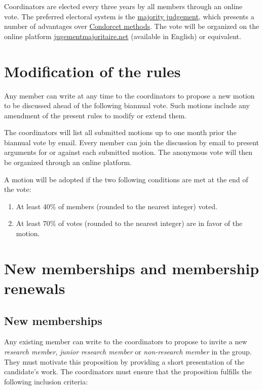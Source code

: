 \documentclass[a4paper, 11pt]{scrartcl}
\begin{document}
\noindent Coordinators are elected every three years by all members through an online vote. The preferred electoral system is the \href{https://en.wikipedia.org/wiki/Majority_judgment}{majority judgement}, which presents a number of advantages over \href{https://en.wikipedia.org/wiki/Condorcet_method}{Condorcet methods}. The vote will be organized on the online platform \href{https://jugementmajoritaire.net/}{jugementmajoritaire.net} (available in English) or equivalent.

\section{Modification of the rules}
\label{modif}

Any member can write at any time to the coordinators to propose a new motion to be discussed ahead of the following biannual vote. Such motions include any amendment of the present rules to modify or extend them. 

The coordinators will list all submitted motions up to one month prior the biannual vote by email. Every member can join the discussion by email to present arguments for or against each submitted motion. The anonymous vote will then be organized through an online platform. 

A motion will be adopted if the two following conditions are met at the end of the vote:

\begin{enumerate}
\item At least 40\% of members (rounded to the nearest integer) voted.
\item At least 70\% of votes (rounded to the nearest integer) are in favor of the motion.
\end{enumerate} 

\section{New memberships and membership renewals}

\subsection{New memberships}
\label{new_memberships}

Any existing member can write to the coordinators to propose to invite a new \emph{research member}, \emph{junior research member} or \emph{non-research member} in the group. They must motivate this proposition by providing a short presentation of the candidate's work. The coordinators must ensure that the proposition fulfills the following inclusion criteria: \\
\end{document}
